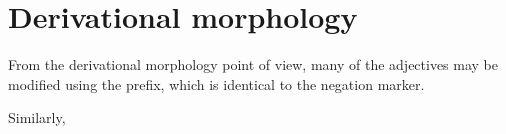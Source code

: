 \chapter{Derivational morphology}
\label{ch:derivational}



From the derivational morphology point of view, many of the adjectives may be
modified using the  prefix, which is identical to the negation marker.



Similarly,

